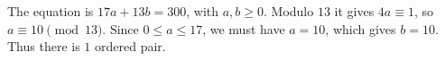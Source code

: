 The equation is $17a+13b=300$, with $a,b\ge0$. Modulo $13$ it gives $4a\equiv1$, so $a\equiv10\pmod{13}$. Since $0\le a\le17$, we must have $a=10$, which gives $b=10$. Thus there is $\boxed1$ ordered pair.
